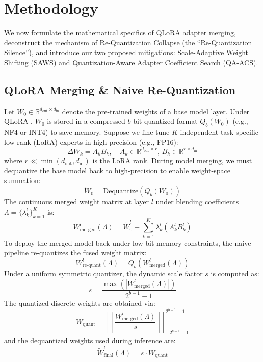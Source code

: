 \section{Methodology}
\label{sec:method}

We now formulate the mathematical specifics of QLoRA adapter merging, deconstruct the mechanism of Re-Quantization Collapse (the ``Re-Quantization Silence''), and introduce our two proposed mitigations: Scale-Adaptive Weight Shifting (SAWS) and Quantization-Aware Adapter Coefficient Search (QA-ACS).

\subsection{QLoRA Merging \& Naive Re-Quantization}
Let $W_0 \in \mathbb{R}^{d_{\text{out}} \times d_{\text{in}}}$ denote the pre-trained weights of a base model layer. Under QLoRA \cite{Dettmers2023QLoRA}, $W_0$ is stored in a compressed $b$-bit quantized format $Q_b(W_0)$ (e.g., NF4 or INT4) to save memory. 
Suppose we fine-tune $K$ independent task-specific low-rank (LoRA) experts in high-precision (e.g., FP16):
\begin{equation}
  \Delta W_k = A_k B_k, \quad A_k \in \mathbb{R}^{d_{\text{out}} \times r}, \, B_k \in \mathbb{R}^{r \times d_{\text{in}}}
\end{equation}
where $r \ll \min(d_{\text{out}}, d_{\text{in}})$ is the LoRA rank. 
During model merging, we must dequantize the base model back to high-precision to enable weight-space summation:
\begin{equation}
  \tilde{W}_0 = \text{Dequantize}\left(Q_b(W_0)\right)
\end{equation}
The continuous merged weight matrix at layer $l$ under blending coefficients $\Lambda = \{\lambda_k^l\}_{k=1}^K$ is:
\begin{equation}
  W^l_{\text{merged}}(\Lambda) = \tilde{W}^l_0 + \sum_{k=1}^K \lambda^l_k (A^l_k B^l_k)
\end{equation}
To deploy the merged model back under low-bit memory constraints, the naive pipeline re-quantizes the fused weight matrix:
\begin{equation}
  W^l_{\text{re-quant}}(\Lambda) = Q_b\left(W^l_{\text{merged}}(\Lambda)\right)
\end{equation}
Under a uniform symmetric quantizer, the dynamic scale factor $s$ is computed as:
\begin{equation}
  s = \frac{\max\left(|W^l_{\text{merged}}(\Lambda)|\right)}{2^{b-1} - 1}
\end{equation}
The quantized discrete weights are obtained via:
\begin{equation}
  W_{\text{quant}} = \left[ \left\lfloor \frac{W^l_{\text{merged}}(\Lambda)}{s} \right\rceil \right]_{-2^{b-1}+1}^{2^{b-1}-1}
\end{equation}
and the dequantized weights used during inference are:
\begin{equation}
  \tilde{W}^l_{\text{final}}(\Lambda) = s \cdot W_{\text{quant}}
\end{equation}

